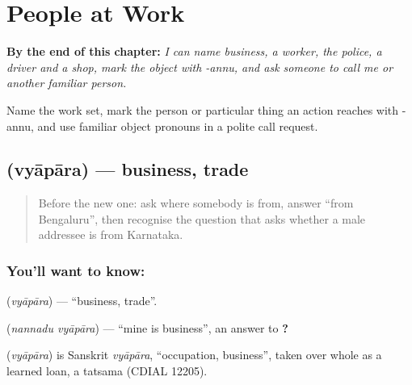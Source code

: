 
\chapter{People at Work}
\label{ch:ka-people-at-work}

\begin{chapteropening}
\textbf{By the end of this chapter:} \emph{I can name business, a worker, the police, a driver and a shop, mark the object with -annu, and ask someone to call me or another familiar person.}

Name the work set, mark the person or particular thing an action reaches with -annu, and use familiar object pronouns in a polite call request.
\end{chapteropening}

\section[\texorpdfstring{\kn{ವ್ಯಾಪಾರ} (vyāpāra)}{ವ್ಯಾಪಾರ (vyāpāra)}]{ (vyāpāra) — business, trade}

\label{lesson:KA-C104-business}



\begin{quote}
Before the new one: ask where somebody is from, answer “from Bengaluru”, then recognise the question that asks whether a male addressee is from Karnataka.
\end{quote}

\subsection*{You'll want to know: }
\textbf{} (\emph{vyāpāra}) — \textquotedblleft{}business, trade\textquotedblright{}.

\textbf{ } (\emph{nannadu vyāpāra}) — \textquotedblleft{}mine is business\textquotedblright{}, an answer to \textbf{  ?}

\begin{cousinweb}
\textbf{} (\emph{vyāpāra}) is Sanskrit \emph{vyāpāra}, \textquotedblleft{}occupation, business\textquotedblright{}, taken over whole as a learned loan, a tatsama (CDIAL 12205).
\end{cousinweb}

